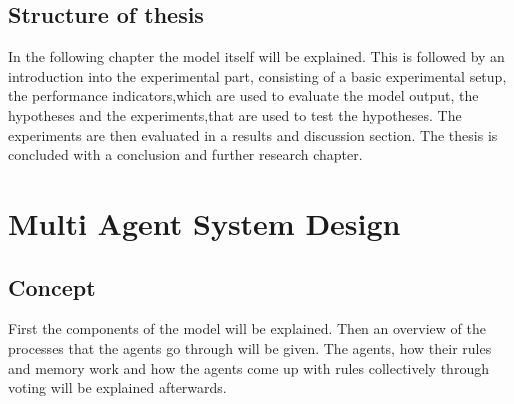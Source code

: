 \documentclass[a4paper]{article}
\begin{document}
\newpage
\subsection{Structure of thesis}
In the following chapter the model itself will be explained. This is followed by an introduction into the experimental part, 
consisting of a basic experimental setup, the performance indicators,which are used to evaluate the model output, the 
hypotheses and the experiments,that are used to test the hypotheses. The experiments are then evaluated in a 
results and discussion section. The thesis is concluded with a conclusion and further research chapter.




\clearpage

\section{Multi Agent System Design}

\subsection{Concept}
First the components of the model will be explained. Then an overview of the processes that the agents go through will be 
given. The agents, how their rules and memory work and how the agents come up with rules collectively through voting 
will be explained afterwards.
\end{document}

